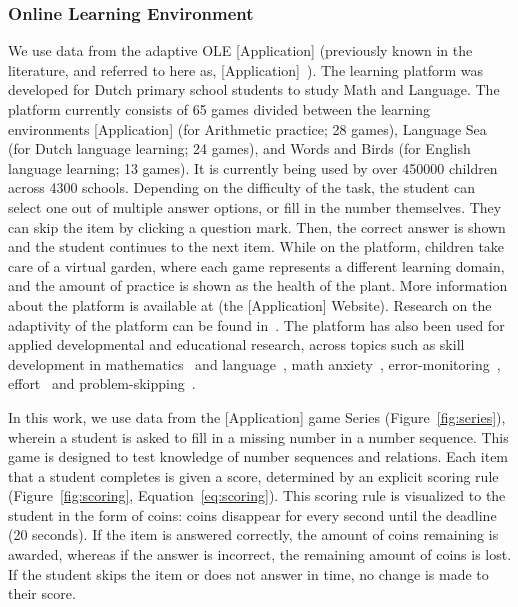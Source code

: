 \documentclass[anonymous,manuscript,review]{acmart}
\begin{document}
\subsubsection{Online Learning Environment}
We use data from the adaptive OLE [Application] (previously known in the literature, and referred to here as, [Application]~\cite{klinkenberg2011computer}). The learning platform was developed for Dutch primary school students to study Math and Language. The platform currently consists of 65 games divided between the learning environments [Application] (for Arithmetic practice; 28 games), Language Sea (for Dutch language learning; 24 games), and Words and Birds (for English language learning; 13 games). It is currently being used by over \num{450000} children across \num{4300} schools. Depending on the difficulty of the task, the student can select one out of multiple answer options, or fill in the number themselves. They can skip the item by clicking a question mark. Then, the correct answer is shown and the student continues to the next item. While on the platform, children take care of a virtual garden, where each game represents a different learning domain, and the amount of practice is shown as the health of the plant. More information about the platform is available at (the [Application] Website). Research on the adaptivity of the platform can be found in~\cite{klinkenberg2011computer, brinkhuis2018learning, brinkhuis2020governing, hofman2018solution}. The platform has also been used for applied developmental and educational research, across topics such as skill development in mathematics~\cite{ou2019modeling} and language~\cite{kievit2019mutualistic}, math anxiety~\cite{jansen2013influence, jansen2016affective, hilz2023relationship}, error-monitoring~\cite{de2022post, de2021error}, effort~\cite{savi2023combating} and problem-skipping~\cite{savi2018delaying}. 

In this work, we use data from the [Application] game Series (Figure~\ref{fig:series}), wherein a student is asked to fill in a missing number in a number sequence. This game is designed to test knowledge of number sequences and relations. Each item that a student completes is given a score, determined by an explicit scoring rule (Figure~\ref{fig:scoring}, Equation~\ref{eq:scoring}). This scoring rule is visualized to the student in the form of coins: coins disappear for every second until the deadline (20 seconds). If the item is answered correctly, the amount of coins remaining is awarded, whereas if the answer is incorrect, the remaining amount of coins is lost. If the student skips the item or does not answer in time, no change is made to their score. 
\end{document}
